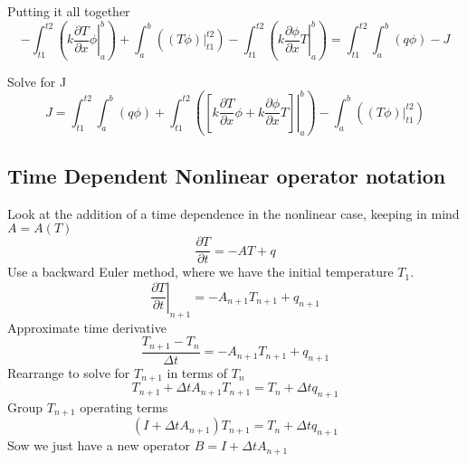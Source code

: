\documentclass[11pt]{article}
\newcommand{\der}[2]{\frac{\partial #1}{\partial #2}}
\begin{document}
Putting it all together 
\[
- \int_{t1}^{t2} \left( \left. k \der{T}{x} \phi \right|_a^b \right) +\int_a^b  \left((T  \phi) \Big|_{t1}^{t2} \right) - \int_{t1}^{t2} \left( \left. k \der{\phi}{x} T \right|_a^b \right) = \int_{t1}^{t2}  \int_a^b \left(q \phi \right) -J
\]

Solve for J
\[
J= \int_{t1}^{t2}  \int_a^b \left(q \phi \right) + \int_{t1}^{t2} \left( \left. \left[ k \der{T}{x} \phi + k \der{\phi}{x} T \right] \right|_a^b \right) - \int_a^b  \left((T  \phi) \Big|_{t1}^{t2} \right)
\]

\subsection{Time Dependent Nonlinear operator notation}
Look at the addition of a time dependence in the nonlinear case, keeping in mind $A=A(T)$
\[
\der{T}{t}=-AT+q
\]
Use a backward Euler method, where we have the initial temperature $T_1$.
\[
\left. \der{T}{t} \right|_{n+1} =-A_{n+1} T_{n+1}+q_{n+1}
\]
Approximate time derivative
\[
\frac{T_{n+1}-T_n}{\Delta t} =-A_{n+1} T_{n+1}+q_{n+1}
\]
Rearrange to solve for $T_{n+1}$ in terms of $T_n$
\[
T_{n+1} + \Delta t A_{n+1} T_{n+1}= T_n+\Delta t q_{n+1}
\]
Group $T_{n+1}$ operating terms
\[
(I + \Delta t A_{n+1}) T_{n+1}= T_n+\Delta t q_{n+1}
\]
Sow we just have a new operator $B=I + \Delta t A_{n+1}$
\end{document}
